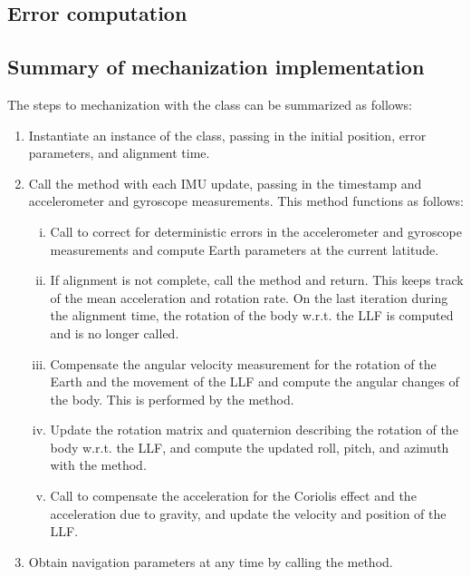 \documentclass[11pt, oneside]{article}   	%
\begin{document}
\subsection{Error computation}

\subsection{Summary of mechanization implementation}
The steps to mechanization with the  class can be summarized as follows:
\begin{enumerate}
	\item Instantiate an instance of the  class, passing in the initial position, error parameters, and alignment time.
	\item Call the  method with each IMU update, passing in the timestamp and accelerometer and gyroscope measurements.  This method functions as follows:
	\begin{enumerate}[i.]
		\item Call  to correct for deterministic errors in the accelerometer and gyroscope measurements and compute Earth parameters at the current latitude.
		\item If alignment is not complete, call the  method and return. This keeps track of the mean acceleration and rotation rate. On the last iteration during the alignment time, the rotation of the body w.r.t. the LLF is computed and  is no longer called.
		\item Compensate the angular velocity measurement for the rotation of the Earth and the movement of the LLF and compute the angular changes of the body.  This is performed by the  method.
		\item Update the rotation matrix and quaternion describing the rotation of the body w.r.t. the LLF, and compute the updated roll, pitch, and azimuth with the  method.
		\item Call  to compensate the acceleration for the Coriolis effect and the acceleration due to gravity, and update the velocity and position of the LLF.
	\end{enumerate}
	\item Obtain navigation parameters at any time by calling the  method.
\end{enumerate}
\end{document}
